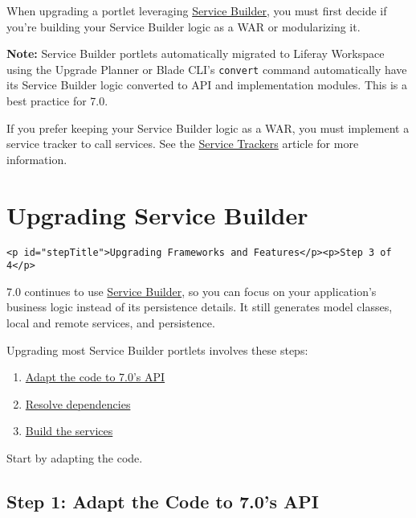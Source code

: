When upgrading a portlet leveraging
\href{/docs/7-2/appdev/-/knowledge_base/a/service-builder}{Service
Builder}, you must first decide if you're building your Service Builder
logic as a WAR or modularizing it.

\noindent\hrulefill

\textbf{Note:} Service Builder portlets automatically migrated to
Liferay Workspace using the Upgrade Planner or Blade CLI's
\texttt{convert} command automatically have its Service Builder logic
converted to API and implementation modules. This is a best practice for
7.0.

\noindent\hrulefill

If you prefer keeping your Service Builder logic as a WAR, you must
implement a service tracker to call services. See the
\href{/docs/7-2/frameworks/-/knowledge_base/f/using-a-service-tracker}{Service
Trackers} article for more information.

\chapter{Upgrading Service Builder}\label{upgrading-service-builder}

\begin{verbatim}
<p id="stepTitle">Upgrading Frameworks and Features</p><p>Step 3 of 4</p>
\end{verbatim}

7.0 continues to use
\href{/docs/7-2/appdev/-/knowledge_base/a/service-builder}{Service
Builder}, so you can focus on your application's business logic instead
of its persistence details. It still generates model classes, local and
remote services, and persistence.

Upgrading most Service Builder portlets involves these steps:

\begin{enumerate}
\def\labelenumi{\arabic{enumi}.}
\tightlist
\item
  \hyperref[step-1-adapt-the-code-to-product-vers-api]{Adapt the code to
  7.0's API}
\item
  \hyperref[step-2-resolve-dependencies]{Resolve dependencies}
\item
  \hyperref[step-3-build-the-services]{Build the services}
\end{enumerate}

Start by adapting the code.

\section{Step 1: Adapt the Code to 7.0's
API}\label{step-1-adapt-the-code-to-7.0s-api}

